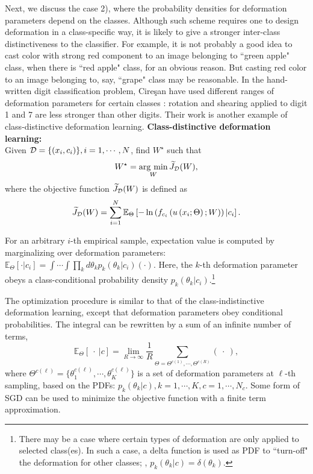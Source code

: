 \documentclass[10pt,twocolumn,letterpaper]{article}
\newcommand{\argmin}{\mathop{\rm arg~min}\limits}
\begin{document}
Next, we discuss the case 2), where
the probability densities for deformation parameters depend on the classes.
Although such scheme requires one to design deformation in a
class-specific way, it is likely to give a stronger inter-class
distinctiveness to the classifier.
For example,
it is not probably a good idea to cast color with strong red component
to an image belonging to ``green apple" class, when
there is ``red apple" class, for an obvious reason.
But casting red color to an image belonging to, say, ``grape" class may be reasonable.
In the hand-written digit classification problem, 
Cire{\c s}an \etal have used different ranges of deformation
parameters for certain classes
\cite{Ciresan:2010}:
rotation and shearing applied to digit 1 and 7 are
less stronger than other digits.
Their work is another example of class-distinctive deformation learning.
\newline
\newline
{\bf Class-distinctive deformation learning:} \\
Given ${\cal D} = \{ (x_i, c_i) \}, i=1,\cdots,N$, find $W^\star$ such that
\begin{equation}
W^\star = \argmin_W \widetilde{J}_{\cal D}(W),
\end{equation}
where the objective function $\widetilde{J}_{\cal D}(W)$ is defined as
\begin{equation}
\widetilde{J}_{\cal D}(W) = \sum_{i=1}^N \mathbb{E}_\Theta
\left[ - \ln \left( f_{c_i} \left( u \left( x_i; 
\Theta \right); W \right) \right) | c_i \right].
\label{class-distinctive-cost}
\end{equation}

For an arbitrary $i$-th empirical sample,
expectation value is computed by marginalizing over 
deformation parameters:
$\mathbb{E}_{\Theta}[\cdot | c_i] = \int\cdots\int\prod_k d\theta_k 
p_k (\theta_k | c_i) (\cdot)$.
Here, the $k$-th deformation parameter 
obeys a class-conditional probability density $p_k (\theta_k | c_i)$.\footnote{There may be a case where 
certain types of deformation are only applied to selected class(es). In such a
case, a delta function is used as PDF to ``turn-off" the deformation for other classes; 
\ie, $p_k(\theta_k | c) = \delta (\theta_k)$.}

The optimization procedure is similar to that of the class-indistinctive
deformation learning, except that deformation parameters obey
conditional probabilities.
The integral can be rewritten by a sum of an infinite number of terms,
\begin{equation}
\mathbb{E}_{\Theta} \left[ ~\cdot ~| c \right]
= \lim_{R\rightarrow\infty} \frac{1}{R} \sum_{\Theta = \Theta^{c (1)}, \cdots, \Theta^{c(R)}} (~\cdot ~),
\end{equation}
where $\Theta^{c(\ell)} = \{\theta_1^{c(\ell)}, \cdots, \theta_K^{c(\ell)} \}$ is a
set of deformation parameters at $\ell$-th sampling, based on the 
PDFs: $p_k(\theta_k|c), k=1,\cdots,K, c=1,\cdots, N_c$.
Some form of SGD can be used to minimize the objective function
with a finite term approximation.
\end{document}

